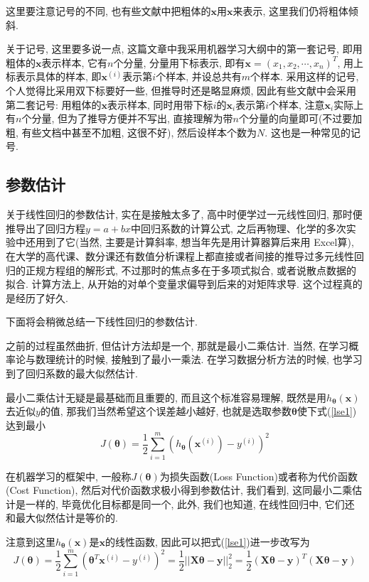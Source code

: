 \documentclass[a4paper,UTF8]{ctexart}
\theoremstyle{plain} \newtheorem{theorem}{定理}[section]
\theoremstyle{plain} \newtheorem{definition}{定义}[section]
\theoremstyle{plain} \newtheorem{lemma}{引理}[section]
\theoremstyle{plain} \newtheorem{proposition}{命题}[section]
\theoremstyle{plain} \newtheorem{example}{例}[section]
\theoremstyle{plain} \newtheorem{remark}{注}[section]
\theoremstyle{plain} \newtheorem{corollary}{推论}[section]
\begin{document}
这里要注意记号的不同, 也有些文献中把粗体的$\bm{x}$用$\mathbf{x}$来表示, 这里我们仍将粗体倾斜.

关于记号, 这里要多说一点, 这篇文章中我采用机器学习大纲中的第一套记号, 即用粗体的$\bm{x}$表示样本, 它有$n$个分量, 分量用下标表示, 即有$\bm{x} = (x_{1}, x_{2}, \cdots, x_{n})^{T}$, 用上标表示具体的样本, 即$\bm{x}^{(i)}$表示第$i$个样本, 并设总共有$m$个样本. 采用这样的记号, 个人觉得比采用双下标要好一些, 但推导时还是略显麻烦, 因此有些文献中会采用第二套记号: 用粗体的$\bm{x}$表示样本, 同时用带下标$i$的$\bm{x}_{i}$表示第$i$个样本, 注意$\bm{x}_{i}$实际上有$n$个分量, 但为了推导方便并不写出, 直接理解为带$n$个分量的向量即可(不过要加粗, 有些文档中甚至不加粗, 这很不好), 然后设样本个数为$N$. 这也是一种常见的记号.


\subsection{参数估计}
关于线性回归的参数估计, 实在是接触太多了, 高中时便学过一元线性回归, 那时便推导出了回归方程$y = a + b x$中回归系数的计算公式, 之后再物理、化学的多次实验中还用到了它(当然, 主要是计算斜率, 想当年先是用计算器算后来用 Excel算), 在大学的高代课、数分课还有数值分析课程上都直接或者间接的推导过多元线性回归的正规方程组的解形式, 不过那时的焦点多在于多项式拟合, 或者说散点数据的拟合. 计算方法上, 从开始的对单个变量求偏导到后来的对矩阵求导. 这个过程真的是经历了好久.

下面将会稍微总结一下线性回归的参数估计.

之前的过程虽然曲折, 但估计方法却是一个, 那就是最小二乘估计. 当然, 在学习概率论与数理统计的时候, 接触到了最小一乘法. 在学习数据分析方法的时候, 也学习到了回归系数的最大似然估计.

最小二乘估计无疑是最基础而且重要的, 而且这个标准容易理解, 既然是用$h_{\bm{\theta}}(\bm{x})$去近似$y$的值, 那我们当然希望这个误差越小越好, 也就是选取参数$\bm{\theta}$使下式(\ref{lse1})达到最小
\begin{equation}\label{lse1}
J(\bm{\theta}) = \frac{1}{2} \sum_{i=1}^{m} (h_{\bm{\theta}}(\bm{x}^{(i)}) - y^{(i)})^2
\end{equation}

在机器学习的框架中, 一般称$J(\bm{\theta})$为损失函数(Loss Function)或者称为代价函数(Cost Function), 然后对代价函数求极小得到参数估计, 我们看到, 这同最小二乘估计是一样的, 毕竟优化目标都是同一个, 此外, 我们也知道, 在线性回归中, 它们还和最大似然估计是等价的.

注意到这里$h_{\bm{\theta}}(\bm{x})$是$\bm{x}$的线性函数, 因此可以把式(\ref{lse1})进一步改写为
\begin{equation}\label{lse2}
J(\bm{\theta}) = \frac{1}{2} \sum_{i=1}^{m} (\bm{\theta}^{T} \bm{x}^{(i)} - y^{(i)})^{2} = \frac{1}{2} ||\bm{X} \bm{\theta} - \bm{y}||_{2}^{2} = \frac{1}{2} (\bm{X} \bm{\theta} - \bm{y})^{T} (\bm{X} \bm{\theta} - \bm{y})
\end{equation}
\end{document}
